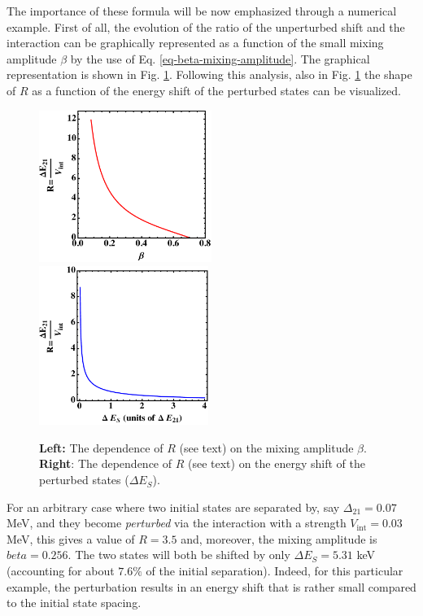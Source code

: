 The importance of these formula will be now emphasized through a numerical example. First of all, the evolution of the ratio of the unperturbed shift and the interaction can be graphically represented as a function of the small mixing amplitude $\beta$ by the use of Eq. \ref{eq-beta-mixing-amplitude}. The graphical representation is shown in Fig. \ref{fig-beta-mixing-amplitude}. Following this analysis, also in Fig. \ref{fig-beta-mixing-amplitude} the shape of $R$ as a function of the energy shift of the perturbed states can be visualized.

\begin{figure}
    \centering
    \includegraphics[width=0.5\textwidth]{Chapters/Figures/beta_mixing_amplitude.pdf}
    \includegraphics[width=0.49\textwidth]{Chapters/Figures/energy_shift_mixing_shape.pdf}
    \caption{\textbf{Left:} The dependence of $R$ (see text) on the mixing amplitude $\beta$. \textbf{Right}: The dependence of $R$ (see text) on the energy shift of the perturbed states ($\Delta E_S$).}
    \label{fig-beta-mixing-amplitude}
\end{figure}

For an arbitrary case where two initial states are separated by, say $\Delta_{21}=0.07$ MeV, and they become \emph{perturbed} via the interaction with a strength $V_\text{int}=0.03$ MeV, this gives a value of $R=3.5$ and, moreover, the mixing amplitude is $beta=0.256$. The two states will both be shifted by only $\Delta E_S=5.31$ keV (accounting for about $7.6 \%$ of the initial separation). Indeed, for this particular example, the perturbation results in an energy shift that is rather small compared to the initial state spacing.

